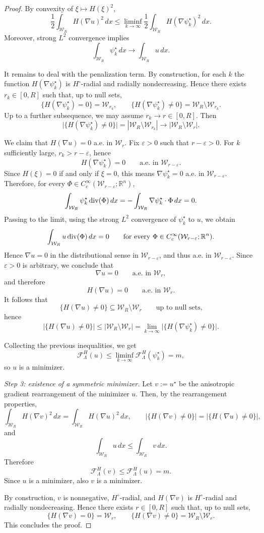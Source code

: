 \documentclass[oneside,a4paper,12pt,notitlepage]{article}
\theoremstyle{definition}
\newcommand{\R}{\mathbb{R}}
\newcommand{\W}{\mathcal{W}}
\begin{document}
\begin{proof}
By convexity of $\xi\mapsto H(\xi)^2$,
\[
\frac12\int_{\W_R}H(\nabla u)^2\,dx
\le
\liminf_{k\to\infty}
\frac12\int_{\W_R}H(\nabla\psi_k^\star)^2\,dx.
\]
Moreover, strong $L^2$ convergence implies
\[
\int_{\W_R}\psi_k^\star\,dx \to \int_{\W_R}u\,dx.
\]

It remains to deal with the penalization term.
By construction, for each $k$ the function $H(\nabla\psi_k^\star)$ is $H^\circ$-radial and radially nondecreasing.
Hence there exists $r_k\in[0,R]$ such that, up to null sets,
\[
\{H(\nabla\psi_k^\star)=0\}=\W_{r_k},
\qquad
\{H(\nabla\psi_k^\star)\neq 0\}=\W_R\setminus \W_{r_k}.
\]
Up to a further subsequence, we may assume $r_k\to r\in[0,R]$.
Then
\[
\big|\{H(\nabla\psi_k^\star)\neq 0\}\big|
=
|\W_R\setminus \W_{r_k}|
\to
|\W_R\setminus \W_r|.
\]

We claim that $H(\nabla u)=0$ a.e. in $\W_r$.
Fix $\varepsilon>0$ such that $r-\varepsilon>0$.
For $k$ sufficiently large, $r_k>r-\varepsilon$, hence
\[
H(\nabla\psi_k^\star)=0
\qquad\text{a.e. in }\W_{r-\varepsilon}.
\]
Since $H(\xi)=0$ if and only if $\xi=0$, this means $\nabla\psi_k^\star=0$ a.e. in $\W_{r-\varepsilon}$.
Therefore, for every $\Phi\in C_c^\infty(\W_{r-\varepsilon};\R^n)$,
\[
\int_{\W_R}\psi_k^\star\,{\rm div}(\Phi)\,dx
=
-\int_{\W_R}\nabla\psi_k^\star\cdot \Phi\,dx
=0.
\]
Passing to the limit, using the strong $L^2$ convergence of $\psi_k^\star$ to $u$, we obtain
\[
\int_{\W_R}u\,{\rm div}(\Phi)\,dx=0
\qquad\text{for every }\Phi\in C_c^\infty(\W_{r-\varepsilon};\R^n).
\]
Hence $\nabla u=0$ in the distributional sense in $\W_{r-\varepsilon}$, and thus a.e. in $\W_{r-\varepsilon}$.
Since $\varepsilon>0$ is arbitrary, we conclude that
\[
\nabla u=0 \qquad\text{a.e. in }\W_r,
\]
and therefore
\[
H(\nabla u)=0 \qquad\text{a.e. in }\W_r.
\]
It follows that
\[
\{H(\nabla u)\neq 0\}\subseteq \W_R\setminus \W_r
\qquad\text{up to null sets,}
\]
hence
\[
\big|\{H(\nabla u)\neq 0\}\big|
\le |\W_R\setminus \W_r|
=
\lim_{k\to\infty}\big|\{H(\nabla\psi_k^\star)\neq 0\}\big|.
\]

Collecting the previous inequalities, we get
\[
\mathcal F^H_\Lambda(u)
\le \liminf_{k\to\infty}\mathcal F^H_\Lambda(\psi_k^\star)
= m,
\]
so $u$ is a minimizer.

\medskip
\noindent
\textit{Step 3: existence of a symmetric minimizer.}
Let $v:=u^\star$ be the anisotropic gradient rearrangement of the minimizer $u$.
Then, by the rearrangement properties,
\[
\int_{\W_R}H(\nabla v)^2\,dx=\int_{\W_R}H(\nabla u)^2\,dx,
\qquad
\big|\{H(\nabla v)\neq 0\}\big|=\big|\{H(\nabla u)\neq 0\}\big|,
\]
and
\[
\int_{\W_R}u\,dx\le \int_{\W_R}v\,dx.
\]
Therefore
\[
\mathcal F^H_\Lambda(v)\le \mathcal F^H_\Lambda(u)=m.
\]
Since $u$ is a minimizer, also $v$ is a minimizer.

By construction, $v$ is nonnegative, $H^\circ$-radial, and $H(\nabla v)$ is $H^\circ$-radial and radially nondecreasing.
Hence there exists $r\in[0,R]$ such that, up to null sets,
\[
\{H(\nabla v)=0\}=\W_r,
\qquad
\{H(\nabla v)\neq 0\}=\W_R\setminus \W_r.
\]
This concludes the proof.
\end{proof}
\end{document}
